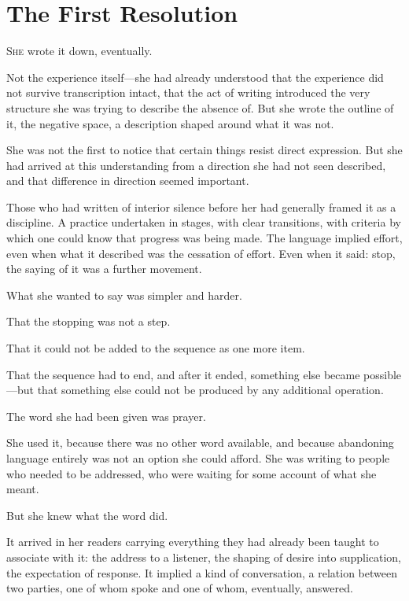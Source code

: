 
\chapter{The First Resolution}


\lettrine{S}{he} wrote it down, eventually.

Not the experience itself---she had already understood that the
experience did not survive transcription intact, that the act of
writing introduced the very structure she was trying to
describe the absence of. But she wrote the outline of it, the
negative space, a description shaped around what it was not.

She was not the first to notice that certain things resist direct
expression. But she had arrived at this understanding from a
direction she had not seen described, and that difference in
direction seemed important.

Those who had written of interior silence before her had
generally framed it as a discipline. A practice undertaken in
stages, with clear transitions, with criteria by which one could
know that progress was being made. The language implied effort,
even when what it described was the cessation of effort. Even
when it said: stop, the saying of it was a further movement.

What she wanted to say was simpler and harder.

That the stopping was not a step.

That it could not be added to the sequence as one more item.

That the sequence had to end, and after it ended, something else
became possible---but that something else could not be produced
by any additional operation.

\scenebreak

The word she had been given was prayer.

She used it, because there was no other word available, and
because abandoning language entirely was not an option she could
afford. She was writing to people who needed to be addressed,
who were waiting for some account of what she meant.

But she knew what the word did.

It arrived in her readers carrying everything they had already
been taught to associate with it: the address to a listener, the
shaping of desire into supplication, the expectation of response.
It implied a kind of conversation, a relation between two
parties, one of whom spoke and one of whom, eventually, answered.

